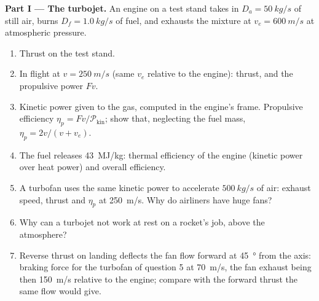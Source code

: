 \begin{problem}
\label{pb:b2:flow-balances:1}

\medskip
\noindent\textbf{Part I --- The turbojet.}
An engine on a test stand takes in $D_a = \qty{50}{kg/s}$ of still air,
burns $D_f = \qty{1.0}{kg/s}$ of fuel, and exhausts the mixture at $v_e =
\qty{600}{m/s}$ at atmospheric pressure.
\begin{enumerate}
  \item Thrust on the test stand.
  \item In flight at $v = \qty{250}{m/s}$ (same $v_e$ relative to the
        engine): thrust, and the propulsive power $Fv$.
  \item Kinetic power given to the gas, computed in the engine's frame.
        Propulsive efficiency $\eta_p = Fv/\mathcal P_{\text{kin}}$; show
        that, neglecting the fuel mass, $\eta_p = 2v/(v + v_e)$.
  \item The fuel releases \qty{43}{MJ/kg}: thermal efficiency of the
        engine (kinetic power over heat power) and overall efficiency.
  \item A turbofan uses the same kinetic power to accelerate
        $\qty{500}{kg/s}$ of air: exhaust speed, thrust and $\eta_p$ at
        \qty{250}{m/s}. Why do airliners have huge fans?
  \item Why can a turbojet not work at rest on a rocket's job, above
        the atmosphere?
  \item Reverse thrust on landing deflects the fan flow forward at
        \qty{45}{\degree} from the axis: braking force for the turbofan
        of question 5 at \qty{70}{m/s}, the fan exhaust being then
        \qty{150}{m/s} relative to the engine; compare with the forward
        thrust the same flow would give.
\end{enumerate}


\end{problem}
